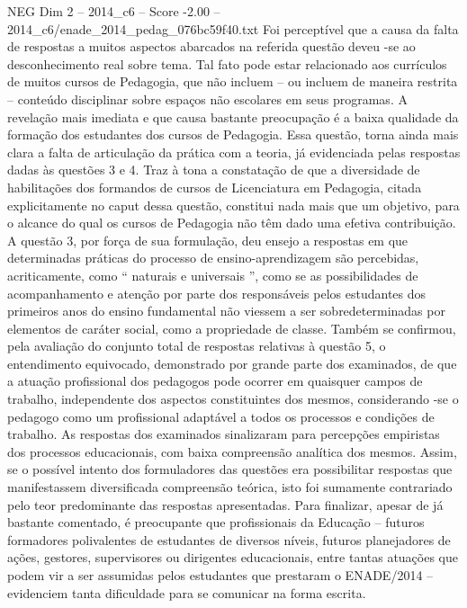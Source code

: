 \begin{textsample}{NEG Dim 2 – 2014\_c6 – Score -2.00 – 2014\_c6/enade\_2014\_pedag\_076bc59f40.txt}
Foi perceptível que a causa da falta de respostas a muitos aspectos abarcados na referida questão deveu -se ao desconhecimento real sobre tema.
Tal fato pode estar relacionado aos currículos de muitos cursos de Pedagogia, que não incluem – ou incluem de maneira restrita – conteúdo disciplinar sobre espaços não escolares em seus programas.
A revelação mais imediata e que causa bastante preocupação é a baixa qualidade da formação dos estudantes dos cursos de Pedagogia.
Essa questão, torna ainda mais clara a falta de articulação da prática com a teoria, já evidenciada pelas respostas dadas às questões 3 e 4.
Traz à tona a constatação de que a diversidade de habilitações dos formandos de cursos de Licenciatura em Pedagogia, citada explicitamente no caput dessa questão, constitui nada mais que um objetivo, para o alcance do qual os cursos de Pedagogia não têm dado uma efetiva contribuição.
A questão 3, por força de sua formulação, deu ensejo a respostas em que determinadas práticas do processo de ensino-aprendizagem são percebidas, acriticamente, como “ naturais e universais ”, como se as possibilidades de acompanhamento e atenção por parte dos responsáveis pelos estudantes dos primeiros anos do ensino fundamental não viessem a ser sobredeterminadas por elementos de caráter social, como a propriedade de classe.
Também se confirmou, pela avaliação do conjunto total de respostas relativas à questão 5, o entendimento equivocado, demonstrado por grande parte dos examinados, de que a atuação profissional dos pedagogos pode ocorrer em quaisquer campos de trabalho, independente dos aspectos constituintes dos mesmos, considerando -se o pedagogo como um profissional adaptável a todos os processos e condições de trabalho.
As respostas dos examinados sinalizaram para percepções empiristas dos processos educacionais, com baixa compreensão analítica dos mesmos.
Assim, se o possível intento dos formuladores das questões era possibilitar respostas que manifestassem diversificada compreensão teórica, isto foi sumamente contrariado pelo teor predominante das respostas apresentadas.
Para finalizar, apesar de já bastante comentado, é preocupante que profissionais da Educação – futuros formadores polivalentes de estudantes de diversos níveis, futuros planejadores de ações, gestores, supervisores ou dirigentes educacionais, entre tantas atuações que podem vir a ser assumidas pelos estudantes que prestaram o ENADE/2014 – evidenciem tanta dificuldade para se comunicar na forma escrita.

\end{textsample}
